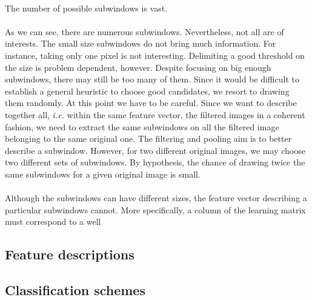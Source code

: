\documentclass[a4paper]{report}
\begin{document}
		\paragraph{}
		The number of possible subwindows is vast. %
		
		\paragraph{}
		As we can see, there are numerous subwindows. Nevertheless, not all are of interests. The small size subwindows do not bring much information. For instance, taking only one pixel is not interesting. Delimiting a good threshold on the size is problem dependent, however. Despite focusing on big enough subwindows, there may still be too many of them. Since it would be difficult to establish a general heuristic to choose good candidates, we resort to drawing them randomly. 
		At this point we have to be careful. Since we want to describe together all, \textit{i.e.} within the same feature vector, the filtered images in a coherent fashion, we need to extract the same subwindows on all the filtered image belonging to the same original one. The filtering and pooling aim is to better describe a subwindow. However, for two different original images, we may choose two different sets of subwindows.
		By hypothesis, the chance of drawing twice the same subwindows for a given original image is small.
		
		\paragraph{}
		Although the subwindows can have different sizes, the feature vector describing a particular subwindows cannot. More specifically, a column of the learning matrix must correspond to a well
		
		\subsection{Feature descriptions}
		\subsection{Classification schemes}
\end{document}
